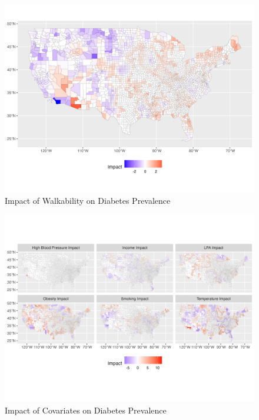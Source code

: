 \documentclass[
]{article}
\begin{document}
\begin{figure}[H]

{\centering \includegraphics{impact_plot.png}

}

\caption{Impact of Walkability on Diabetes Prevalence}

\end{figure}%
\begin{figure}[H]

{\centering \includegraphics{facet_plot.png}

}

\caption{Impact of Covariates on Diabetes Prevalence}

\end{figure}%
\end{document}
